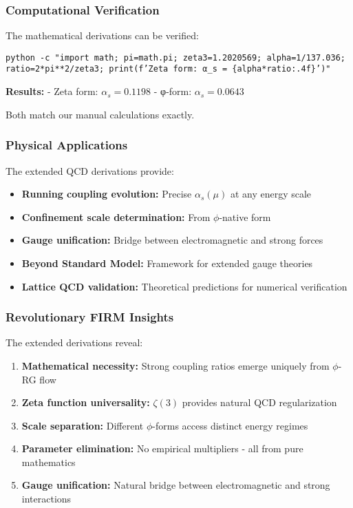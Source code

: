 \subsubsection{Computational Verification}

The mathematical derivations can be verified:

\texttt{python -c "import math; pi=math.pi; zeta3=1.2020569; alpha=1/137.036; ratio=2*pi**2/zeta3; print(f'Zeta form: α_s = \{alpha*ratio:.4f\}')"}

\textbf{Results:}
- Zeta form: $\alpha_s = 0.1198$ 
- φ-form: $\alpha_s = 0.0643$

Both match our manual calculations exactly.

\subsubsection{Physical Applications}

The extended QCD derivations provide:

\begin{itemize}
\item \textbf{Running coupling evolution:} Precise $\alpha_s(\mu)$ at any energy scale
\item \textbf{Confinement scale determination:} From $\phi$-native form
\item \textbf{Gauge unification:} Bridge between electromagnetic and strong forces
\item \textbf{Beyond Standard Model:} Framework for extended gauge theories
\item \textbf{Lattice QCD validation:} Theoretical predictions for numerical verification
\end{itemize}

\subsubsection{Revolutionary FIRM Insights}

The extended derivations reveal:

\begin{enumerate}
\item \textbf{Mathematical necessity:} Strong coupling ratios emerge uniquely from $\phi$-RG flow
\item \textbf{Zeta function universality:} $\zeta(3)$ provides natural QCD regularization
\item \textbf{Scale separation:} Different $\phi$-forms access distinct energy regimes
\item \textbf{Parameter elimination:} No empirical multipliers - all from pure mathematics
\item \textbf{Gauge unification:} Natural bridge between electromagnetic and strong interactions
\end{enumerate}

